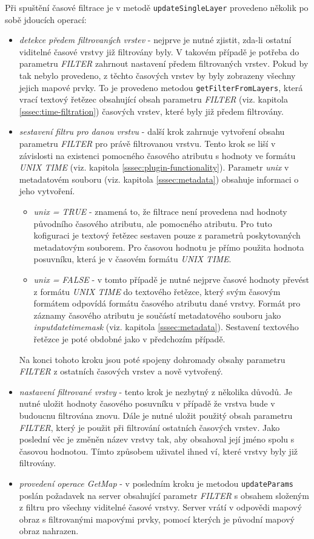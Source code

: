Při spuštění časové filtrace je v metodě \verb|updateSingleLayer|
provedeno několik po sobě jdoucích operací:
\begin{itemize}
\item\textit{detekce předem filtrovaných vrstev} - nejprve je
nutné zjistit, zda-li ostatní viditelné časové vrstvy již
filtrovány byly. V takovém případě je potřeba do parametru
\textit{FILTER} zahrnout nastavení předem filtrovaných
vrstev. Pokud by tak nebylo provedeno, z těchto časových
vrstev by byly zobrazeny všechny jejich mapové prvky. To
je provedeno metodou \verb|getFilterFromLayers|, která vrací
textový řetězec obsahující obsah parametru \textit{FILTER}
(viz. kapitola \ref{sssec:time-filtration}) časových vrstev,
které byly již předem filtrovány.
\item\textit{sestavení filtru pro danou vrstvu} - další krok
zahrnuje vytvoření obsahu parametru \textit{FILTER} pro právě
filtrovanou vrstvu. Tento krok se liší v závislosti na existenci
pomocného časového atributu s hodnoty ve formátu \textit{UNIX
TIME} (viz. kapitola \ref{sssec:plugin-functionality}). Parametr
\textit{unix} v metadatovém souboru (viz. kapitola
\ref{sssec:metadata}) obsahuje informaci o jeho vytvoření.
\begin{itemize}
\item\textit{unix = TRUE} - znamená to, že filtrace není
provedena nad hodnoty původního časového atributu, ale
pomocného atributu. Pro tuto kofiguraci je textový řetězec
sestaven pouze z parametrů poskytovaných metadatovým
souborem. Pro časovou hodnotu je přímo použita hodnota
posuvníku, která je v časovém formátu \textit{UNIX TIME}.
\item\textit{unix = FALSE} - v tomto případě je
nutné nejprve časové hodnoty převést z formátu
\textit{UNIX TIME} do textového řetězce, který
svým časovým formátem odpovídá formátu časového
atributu dané vrstvy. Formát pro záznamy časového
atributu je součástí metadatového souboru jako
\textit{input\textunderscore datetime\textunderscore mask}
(viz. kapitola \ref{sssec:metadata}). Sestavení textového
řetězce je poté obdobné jako v předchozím případě.
\end{itemize}
Na konci tohoto kroku jsou poté spojeny dohromady obsahy parametru
\textit{FILTER} z ostatních časových vrstev a nově vytvořený.
\item\textit{nastavení filtrované vrstvy} - tento krok je nezbytný
z několika důvodů. Je nutné uložit hodnoty časového posuvníku
v případě že vrstva bude v budoucnu filtrována znovu. Dále je
nutné uložit použitý obsah parametru \textit{FILTER}, který
je použit při filtrování ostatních časových vrstev. Jako
poslední věc je změněn název vrstvy tak, aby obsahoval její
jméno spolu s časovou hodnotou. Tímto způsobem uživatel ihned
ví, které vrstvy byly již filtrovány.
\item\textit{provedení operace GetMap} - v posledním kroku je
metodou \verb|updateParams| poslán požadavek na server obsahující
parametr \textit{FILTER} s obsahem složeným z filtru pro všechny
viditelné časové vrstvy. Server vrátí v odpovědi mapový obraz s
filtrovanými mapovými prvky, pomocí kterých je původní mapový
obraz nahrazen.
\end{itemize}

